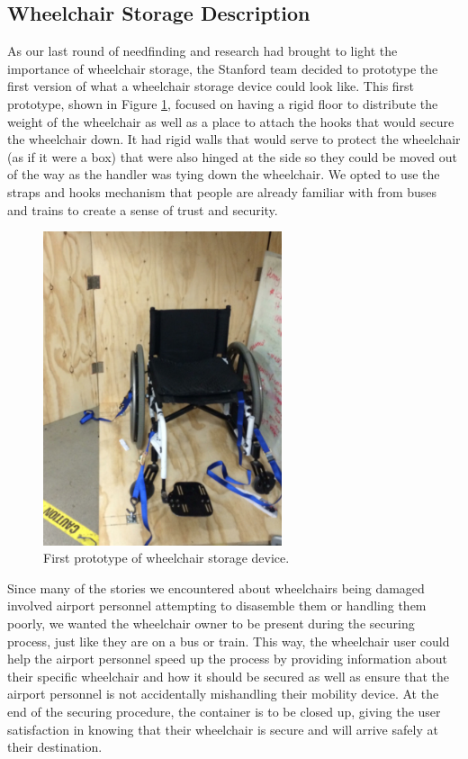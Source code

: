 \newpage

\subsection{Wheelchair Storage Description}

As our last round of needfinding and research had brought to light the importance of wheelchair storage, the Stanford team decided to prototype the first version of what a wheelchair storage device could look like. This first prototype, shown in 
Figure \ref{fig:wheelchairprototype1.png}, focused on having a rigid floor to distribute the weight of the wheelchair as well as a place to attach the hooks that would secure the wheelchair down. It had rigid walls that would serve to protect the wheelchair (as if it were a box) that were also hinged at the side so they could be moved out of the way as the handler was tying down the wheelchair. We opted to use the straps and hooks mechanism that people are already familiar with from buses and trains to create a sense of trust and security. 

\begin{figure}[h]
  \centering
     \includegraphics[width=7cm]{images/wheelchairprototype1.png}
   \caption{First prototype of wheelchair storage device.}
  \label{fig:wheelchairprototype1.png}
\end{figure}

Since many of the stories we encountered about wheelchairs being damaged involved airport personnel attempting to disasemble them or handling them poorly, we wanted the wheelchair owner to be present during the securing process, just like they are on a bus or train. This way, the wheelchair user could help the airport personnel speed up the process by providing information about their specific wheelchair and how it should be secured as well as ensure that the airport personnel is not accidentally mishandling their mobility device. At the end of the securing procedure, the container is to be closed up, giving the user satisfaction in knowing that their wheelchair is secure and will arrive safely at their destination. 
 

